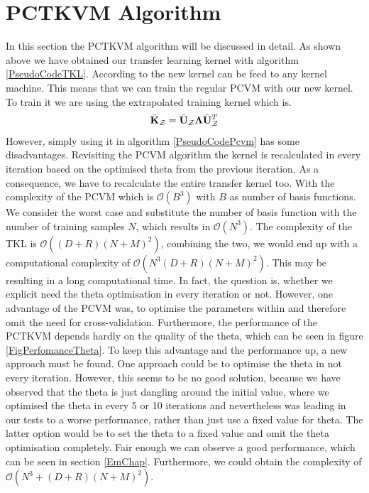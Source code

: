 \section{PCTKVM Algorithm}\label{InSecAlgo}
In this section the \acl{PCTKVM} algorithm will be discussed in detail.
As shown above we have obtained our transfer learning kernel with algorithm \ref{PseudoCodeTKL}.
According to \cite{Long.2015} the new kernel can be feed to any kernel machine.
This means that we can train the regular \acf{PCVM} with our new kernel.
To train it we are using the extrapolated training kernel which is.
\begin{equation}
	\bar{\mathbf{K}}_\mathcal{Z} = \bar{\mathbf{U}}_\mathcal{Z}\mathbf{\Lambda}\bar{\mathbf{U}}_\mathcal{Z}^T
\end{equation}
However, simply using it in algorithm \ref{PseudoCodePcvm} has some disadvantages.
Revisiting the \acs{PCVM} algorithm the kernel is recalculated in every iteration based on the optimised theta from the previous iteration.
As a consequence, we have to recalculate the entire transfer kernel too.
With the complexity of the \acs{PCVM} which is $\mathcal{O}(B^3)$ with $B$ as number of basis functions.
We consider the worst case and substitute the number of basis function with the number of training samples $N$, which results in $\mathcal{O}(N^3)$.
The complexity of the \acs{TKL} is $\mathcal{O}((D+R)(N+M)^2)$, combining the two, we would end up with a computational complexity of $\mathcal{O}(N^3(D+R)(N+M)^2)$.
This may be resulting in a long computational time.
In fact, the question is, whether we explicit need the theta optimisation in every iteration or not.
However, one advantage of the \acs{PCVM} was, to optimise the parameters within and therefore omit the need for cross-validation.
Furthermore, the performance of the \acs{PCTKVM} depends hardly on the quality of the theta, which can be seen in figure \ref{FigPerfomanceTheta}.
To keep this advantage and the performance up, a new approach must be found.
One approach could be to optimise the theta in not every iteration.
However, this seems to be no good solution, because we have observed that the theta is just dangling around the initial value, where we optimised the theta in every 5 or 10 iterations and nevertheless was leading in our tests to a worse performance, rather than just use a fixed value for theta.
The latter option would be to set the theta to a fixed value and omit the theta optimisation completely.
Fair enough we can observe a good performance, which can be seen in section \ref{EmChap}.
Furthermore, we could obtain the complexity of $\mathcal{O}(N^3+(D+R)(N+M)^2)$.
